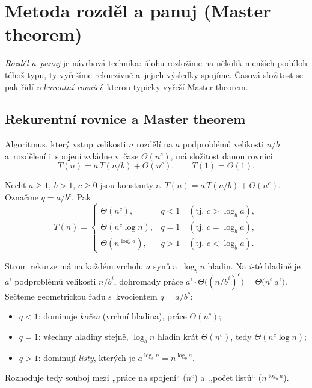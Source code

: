 \documentclass[11pt,a4paper]{article}
\begin{document}
\section{Metoda rozděl a panuj (Master theorem)}

\emph{Rozděl a~panuj} je návrhová technika: úlohu rozložíme na několik menších podúloh téhož typu, ty vyřešíme rekurzivně a~jejich výsledky spojíme. Časová složitost se pak řídí \emph{rekurentní rovnicí}, kterou typicky vyřeší Master theorem.

\subsection{Rekurentní rovnice a Master theorem}

Algoritmus, který vstup velikosti $n$ rozdělí na $a$ podproblémů velikosti $n/b$ a~rozdělení i~spojení zvládne v~čase $\Theta(n^c)$, má složitost danou rovnicí
\[
T(n)=a\,T(n/b)+\Theta(n^c),\qquad T(1)=\Theta(1).
\]

\begin{veta}
Nechť $a\ge1$, $b>1$, $c\ge0$ jsou konstanty a~$T(n)=a\,T(n/b)+\Theta(n^c)$. Označme $q=a/b^c$. Pak
\[
T(n)=
\begin{cases}
\Theta\!\left(n^{c}\right), & q<1\quad(\text{tj. } c>\log_b a),\\[2pt]
\Theta\!\left(n^{c}\log n\right), & q=1\quad(\text{tj. } c=\log_b a),\\[2pt]
\Theta\!\left(n^{\log_b a}\right), & q>1\quad(\text{tj. } c<\log_b a).
\end{cases}
\]
\end{veta}

\begin{intuice}
Strom rekurze má na každém vrcholu $a$ synů a~$\log_b n$ hladin. Na $i$-té hladině je $a^i$ podproblémů velikosti $n/b^i$, dohromady práce $a^i\cdot\Theta\!\big((n/b^i)^c\big)=\Theta\!\big(n^c\,q^{\,i}\big)$. Sečteme geometrickou řadu s~kvocientem $q=a/b^c$:
\begin{itemize}
  \item $q<1$: dominuje \emph{kořen} (vrchní hladina), práce $\Theta(n^c)$;
  \item $q=1$: všechny hladiny stejně, $\log_b n$ hladin krát $\Theta(n^c)$, tedy $\Theta(n^c\log n)$;
  \item $q>1$: dominují \emph{listy}, kterých je $a^{\log_b n}=n^{\log_b a}$.
\end{itemize}
Rozhoduje tedy souboj mezi „práce na spojení`` ($n^c$) a~„počet listů`` ($n^{\log_b a}$).
\end{intuice}
\end{document}
